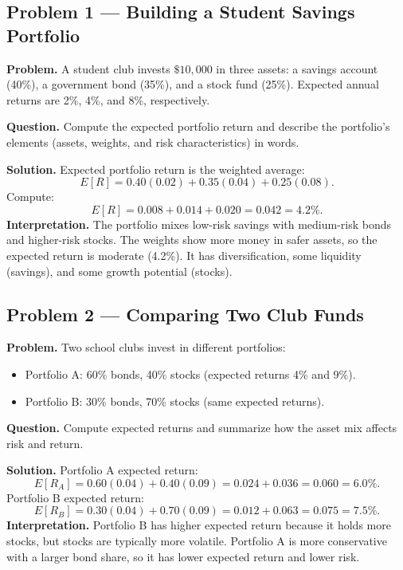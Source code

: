 	\begin{ExamProblems}
		
		\hypertarget{c8-ex1}{}
		\item
		\subsection*{Problem 1 — Building a Student Savings Portfolio}
		
		\textbf{Problem.}
		A student club invests \(\$10{,}000\) in three assets: a savings account (40\%), a government bond (35\%),
		and a stock fund (25\%). Expected annual returns are 2\%, 4\%, and 8\%, respectively.
		
		\textbf{Question.} Compute the expected portfolio return and describe the portfolio's
		elements (assets, weights, and risk characteristics) in words.
		
		\textbf{Solution.}
		Expected portfolio return is the weighted average:
		\[
		E[R]=0.40(0.02)+0.35(0.04)+0.25(0.08).
		\]
		Compute:
		\[
		E[R]=0.008+0.014+0.020=0.042=4.2\%.
		\]
		\textbf{Interpretation.} The portfolio mixes low-risk savings with medium-risk bonds and higher-risk
		stocks. The weights show more money in safer assets, so the expected return is moderate (4.2\%).
		It has diversification, some liquidity (savings), and some growth potential (stocks).
		
		
		\hypertarget{c8-ex2}{}
		\item
		\subsection*{Problem 2 — Comparing Two Club Funds}
		
		\textbf{Problem.}
		Two school clubs invest in different portfolios:
		\begin{itemize}
			\item Portfolio A: 60\% bonds, 40\% stocks (expected returns 4\% and 9\%).
			\item Portfolio B: 30\% bonds, 70\% stocks (same expected returns).
		\end{itemize}
		
		\textbf{Question.} Compute expected returns and summarize how the asset mix affects risk and return.
		
		\textbf{Solution.}
		Portfolio A expected return:
		\[
		E[R_A]=0.60(0.04)+0.40(0.09)=0.024+0.036=0.060=6.0\%.
		\]
		Portfolio B expected return:
		\[
		E[R_B]=0.30(0.04)+0.70(0.09)=0.012+0.063=0.075=7.5\%.
		\]
		\textbf{Interpretation.} Portfolio B has higher expected return because it holds more stocks, but
		stocks are typically more volatile. Portfolio A is more conservative with a larger bond share,
		so it has lower expected return and lower risk.
		
	\end{ExamProblems}
	
